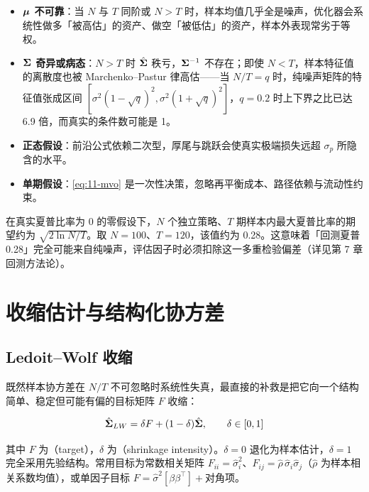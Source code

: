 \begin{warningbox}[均值-方差优化的失效条件]
\begin{itemize}[leftmargin=1.4em, itemsep=2pt]
  \item \textbf{$\bm{\mu}$ 不可靠}：当 $N$ 与 $T$ 同阶或 $N > T$ 时，样本均值几乎全是噪声，优化器会系统性做多「被高估」的资产、做空「被低估」的资产，样本外表现常劣于等权。
  \item \textbf{$\bm{\Sigma}$ 奇异或病态}：$N > T$ 时 $\hat{\bm{\Sigma}}$ 秩亏，$\bm{\Sigma}^{-1}$ 不存在；即使 $N < T$，样本特征值的离散度也被 Marchenko--Pastur 律高估——当 $N/T = q$ 时，纯噪声矩阵的特征值张成区间 $[\sigma^{2}(1-\sqrt{q})^{2}, \sigma^{2}(1+\sqrt{q})^{2}]$，$q = 0.2$ 时上下界之比已达 6.9 倍，而真实的条件数可能是 1。
  \item \textbf{正态假设}：前沿公式依赖二次型，厚尾与跳跃会使真实极端损失远超 $\sigma_p$ 所隐含的水平。
  \item \textbf{单期假设}：\cref{eq:11-mvo} 是一次性决策，忽略再平衡成本、路径依赖与流动性约束。
\end{itemize}
\end{warningbox}

\begin{notebox}[样本夏普比率的偏误]
在真实夏普比率为 0 的零假设下，$N$ 个独立策略、$T$ 期样本内最大夏普比率的期望约为 $\sqrt{2\ln N/T}$。取 $N = 100$、$T = 120$，该值约为 0.28。这意味着「回测夏普 0.28」完全可能来自纯噪声，评估因子时必须扣除这一多重检验偏差（详见第 7 章回测方法论）。
\end{notebox}

\section{收缩估计与结构化协方差}

\subsection{Ledoit--Wolf 收缩}

既然样本协方差在 $N/T$ 不可忽略时系统性失真，最直接的补救是把它向一个结构简单、稳定但可能有偏的目标矩阵 $F$ 收缩：

\begin{equation}\label{eq:11-shrink}
  \hat{\bm{\Sigma}}_{LW} = \delta F + (1-\delta)\hat{\bm{\Sigma}},
  \qquad \delta \in [0,1]
\end{equation}

其中 $F$ 为（target），$\delta$ 为（shrinkage intensity）。$\delta = 0$ 退化为样本估计，$\delta = 1$ 完全采用先验结构。常用目标为常数相关矩阵 $F_{ii} = \hat{\sigma}_i^{2}$、$F_{ij} = \hat{\rho}\,\hat{\sigma}_i\hat{\sigma}_j$（$\hat{\rho}$ 为样本相关系数均值），或单因子目标 $F = \hat{\sigma}^{2}\left[\beta\beta^{\top}\right] + \text{对角项}$。

